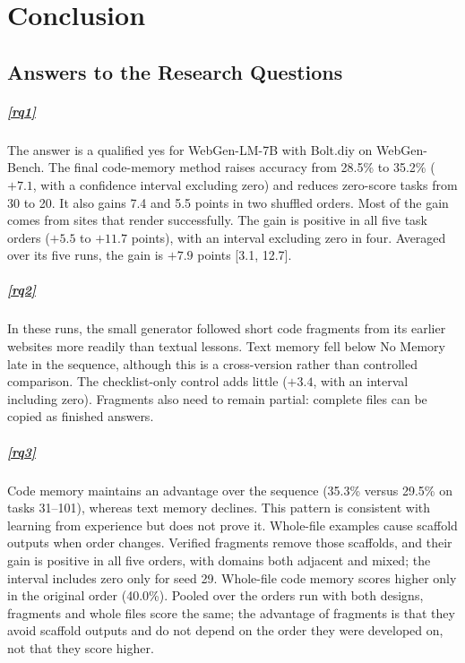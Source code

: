 \chapter{Conclusion}
\label{chap:conclusion}

\section{Answers to the Research Questions}
\paragraph{\ref{rq1}} The answer is a qualified yes for WebGen-LM-7B with Bolt.diy on WebGen-Bench. The final code-memory method raises accuracy from 28.5\% to 35.2\% ($+7.1$, with a confidence interval excluding zero) and reduces zero-score tasks from 30 to 20. It also gains 7.4 and 5.5 points in two shuffled orders. Most of the gain comes from sites that render successfully. The gain is positive in all five task orders ($+5.5$ to $+11.7$ points), with an interval excluding zero in four. Averaged over its five runs, the gain is $+7.9$ points [3.1, 12.7].

\paragraph{\ref{rq2}} In these runs, the small generator followed short code fragments from its earlier websites more readily than textual lessons. Text memory fell below No Memory late in the sequence, although this is a cross-version rather than controlled comparison. The checklist-only control adds little ($+3.4$, with an interval including zero). Fragments also need to remain partial: complete files can be copied as finished answers. 

\paragraph{\ref{rq3}} Code memory maintains an advantage over the sequence (35.3\% versus 29.5\% on tasks 31--101), whereas text memory declines. This pattern is consistent with learning from experience but does not prove it. Whole-file examples cause scaffold outputs when order changes. Verified fragments remove those scaffolds, and their gain is positive in all five orders, with domains both adjacent and mixed; the interval includes zero only for seed 29. Whole-file code memory scores higher only in the original order (40.0\%). Pooled over the orders run with both designs, fragments and whole files score the same; the advantage of fragments is that they avoid scaffold outputs and do not depend on the order they were developed on, not that they score higher.

